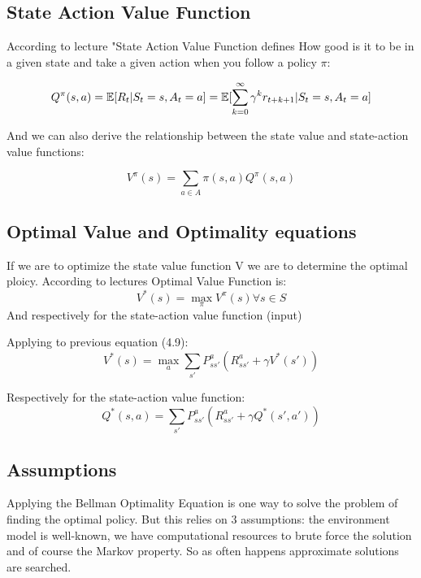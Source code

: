 \subsection{State Action Value Function}
According to lecture "State Action Value Function defines How good is it to be in a given state and take a given action when you follow a policy $\pi$:

\begin{equation}
    Q^{\pi}(s, a) = \operatorname{\mathbb{E}}[R_t | S_t = s, A_t = a] = \operatorname{\mathbb{E}}[\sum^{\infty}_{k=0} \gamma^k r_{t+k+1} | S_t = s, A_t = a]
\end{equation}

And we can also derive the relationship between the state value and state-action value functions:

\begin{equation}
    V^{\pi}(s) = \sum_{a \in A} \pi(s, a) Q^{\pi}(s, a) 
\end{equation}

\subsection{Optimal Value and Optimality equations}
If we are to optimize the state value function V we are to determine the optimal ploicy. According to lectures Optimal Value Function is:
\begin{equation}
    V^*(s) = \max_{\pi} V^{\pi}(s)   \forall s \in S
\end{equation}
And respectively for the state-action value function (input) 

Applying to previous equation (4.9):
\begin{equation}
    V^*(s) = \max_{a}\sum_{s'} P^{a}_{ss'} (R^{a}_{ss'} + \gamma V^{*}(s'))
\end{equation}

Respectively for the state-action value function:
\begin{equation}
    Q^*(s, a) = \sum_{s'} P^{a}_{ss'} (R^{a}_{ss'} + \gamma Q^{*}(s', a'))
\end{equation}

\subsection{Assumptions}

Applying the Bellman Optimality Equation is one way to solve the problem of finding the optimal policy. But this relies on 3 assumptions: the environment model is well-known, we have computational resources to brute force the solution and of course the Markov property. So as often happens approximate solutions are searched.


